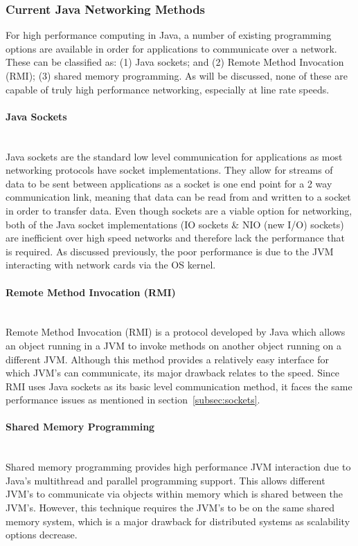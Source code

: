 \documentclass[interim_report.tex]{subfiles}
\begin{document}
\subsubsection{Current Java Networking Methods}
For high performance computing in Java, a number of existing programming options are available in order for applications to communicate over a network. These can be classified as: (1) Java sockets; and (2) Remote Method Invocation (RMI); (3) shared memory programming. As will be discussed, none of these are capable of truly high performance networking, especially at line rate speeds.

\paragraph{Java Sockets}\mbox{}\\ %
\label{subsec:sockets}
Java sockets are the standard low level communication for applications as most networking protocols have socket implementations. They allow for streams of data to be sent between applications as a socket is one end point for a 2 way communication link, meaning that data can be read from and written to a socket in order to transfer data. Even though sockets are a viable option for networking, both of the Java socket implementations (IO sockets \& NIO (new I/O) sockets) are inefficient over high speed networks \cite{sockets} and therefore lack the performance that is required. As discussed previously, the poor performance is due to the JVM interacting with network cards via the OS kernel.

\paragraph{Remote Method Invocation (RMI)}\mbox{}\\ %
Remote Method Invocation (RMI) is a protocol developed by Java which allows an object running in a JVM to invoke methods on another object running on a different JVM. Although this method provides a relatively easy interface for which JVM's can communicate, its major drawback relates to the speed. Since RMI uses Java sockets as its basic level communication method, it faces the same performance issues as mentioned in section~\ref{subsec:sockets}.

\paragraph{Shared Memory Programming}\mbox{}\\ %
Shared memory programming provides high performance JVM interaction due to Java's multithread and parallel programming support. This allows different JVM's to communicate via objects within memory which is shared between the JVM's. However, this technique requires the JVM's to be on the same shared memory system, which is a major drawback for distributed systems as scalability options decrease. \\
\end{document}
